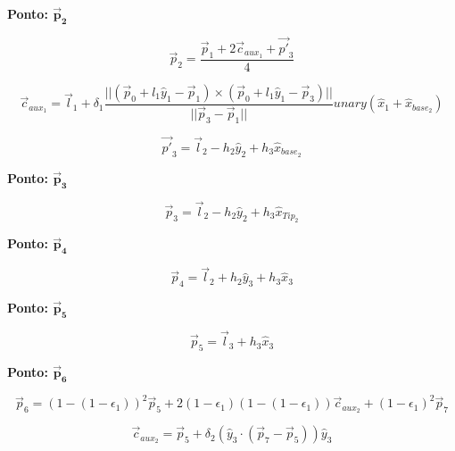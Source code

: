 \documentclass[10pt,a4paper]{report}
\begin{document}
\textbf{Ponto: {$\boldsymbol{\vec{p}_{2}}$}}

\begin{equation}
\vec{p}_{2} = \frac{\vec{p}_{1} + 2 \vec{c}_{aux_{1}} + \vec{p'}_{3}}{4}
\label{eq:p2}
\end{equation}

\begin{equation}
\vec{c}_{aux_{1}} = \vec{l}_{1} + \delta_{1} \frac{|| (\vec{p}_{0} + l_{1} \hat{y}_{1} - \vec{p}_{1}) \times (\vec{p}_{0} + l_{1} \hat{y}_{1} - \vec{p}_{3}) ||}{|| \vec{p}_{3} - \vec{p}_{1} ||} unary(\hat{x}_{1} + \hat{x}_{base_{2}})
\label{eq:c_aux_1}
\end{equation}

\begin{equation}
\vec{p'}_{3} = \vec{l}_{2} - h_{2} \hat{y}_{2} + h_{3} \hat{x}_{base_{2}}
\label{eq:p3_line}
\end{equation}

\textbf{Ponto: {$\boldsymbol{\vec{p}_{3}}$}}

\begin{equation}
\vec{p}_{3} = \vec{l}_{2} - h_{2} \hat{y}_{2} + h_{3} \hat{x}_{Tip_{2}}
\label{eq:p3}
\end{equation}

\textbf{Ponto: {$\boldsymbol{\vec{p}_{4}}$}}

\begin{equation}
\vec{p}_{4} = \vec{l}_{2} + h_{2} \hat{y}_{3} + h_{3} \hat{x}_{3}
\label{eq:p4}
\end{equation}

\textbf{Ponto: {$\boldsymbol{\vec{p}_{5}}$}}

\begin{equation}
\vec{p}_{5} = \vec{l}_{3} + h_{3} \hat{x}_{3}
\label{eq:p5}
\end{equation}

\textbf{Ponto: {$\boldsymbol{\vec{p}_{6}}$}}

\begin{equation}
\vec{p}_{6} = (1 - (1 - \epsilon_{1}))^{2} \vec{p}_{5} + 2 (1 - \epsilon_{1}) (1 - (1 - \epsilon_{1})) \vec{c}_{aux_{2}} + (1 - \epsilon_{1})^{2} \vec{p}_{7}
\label{eq:p6}
\end{equation}

\begin{equation}
\vec{c}_{aux_{2}} = \vec{p}_{5} + \delta_{2} (\hat{y}_{3} \cdot (\vec{p}_{7} - \vec{p}_{5})) \hat{y}_{3}
\label{eq:wing_cp_16}
\end{equation}
\end{document}
